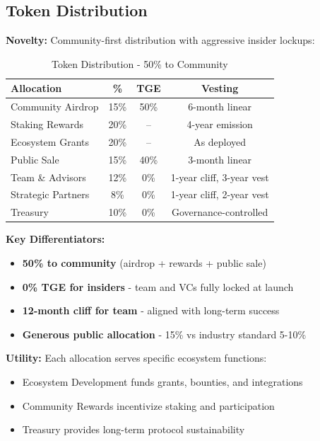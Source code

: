 \documentclass[12pt,a4paper]{article}
\begin{document}
\subsection{Token Distribution}

\textbf{Novelty:} Community-first distribution with aggressive insider lockups:

\begin{table}[h]
\centering
\begin{tabular}{lccc}
\toprule
\textbf{Allocation} & \textbf{\%} & \textbf{TGE} & \textbf{Vesting} \\
\midrule
Community Airdrop & 15\% & 50\% & 6-month linear \\
Staking Rewards & 20\% & -- & 4-year emission \\
Ecosystem Grants & 20\% & -- & As deployed \\
Public Sale & 15\% & 40\% & 3-month linear \\
Team \& Advisors & 12\% & 0\% & 1-year cliff, 3-year vest \\
Strategic Partners & 8\% & 0\% & 1-year cliff, 2-year vest \\
Treasury & 10\% & 0\% & Governance-controlled \\
\bottomrule
\end{tabular}
\caption{Token Distribution - 50\% to Community}
\end{table}

\textbf{Key Differentiators:}
\begin{itemize}
    \item \textbf{50\% to community} (airdrop + rewards + public sale)
    \item \textbf{0\% TGE for insiders} - team and VCs fully locked at launch
    \item \textbf{12-month cliff for team} - aligned with long-term success
    \item \textbf{Generous public allocation} - 15\% vs industry standard 5-10\%
\end{itemize}

\textbf{Utility:} Each allocation serves specific ecosystem functions:
\begin{itemize}
    \item Ecosystem Development funds grants, bounties, and integrations
    \item Community Rewards incentivize staking and participation
    \item Treasury provides long-term protocol sustainability
\end{itemize}
\end{document}

